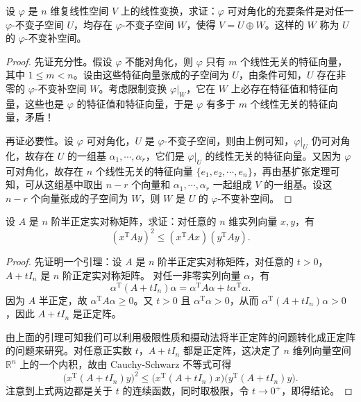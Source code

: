\documentclass[lang=cn,12pt]{elegantbook}
\begin{document}
\begin{example}
设 \(\varphi\) 是 \(n\) 维复线性空间 \(V\) 上的线性变换，求证：\(\varphi\) 可对角化的充要条件是对任一 \(\varphi\)-不变子空间 \(U\)，均存在 \(\varphi\)-不变子空间 \(W\)，使得 \(V = U \oplus W\)。这样的 \(W\) 称为 \(U\) 的 \(\varphi\)-不变补空间。
\end{example}

\begin{proof}
先证充分性。假设 \(\varphi\) 不能对角化，则 \(\varphi\) 只有 \(m\) 个线性无关的特征向量，其中 \(1 \leq m < n\)。设由这些特征向量张成的子空间为 \(U\)，由条件可知，\(U\) 存在非零的 \(\varphi\)-不变补空间 \(W\)。考虑限制变换 \(\varphi|_{W}\)，它在 \(W\) 上必存在特征值和特征向量，这些也是 \(\varphi\) 的特征值和特征向量，于是 \(\varphi\) 有多于 \(m\) 个线性无关的特征向量，矛盾！

再证必要性。设 \(\varphi\) 可对角化，\(U\) 是 \(\varphi\)-不变子空间，则由上例可知，\(\varphi|_{U}\) 仍可对角化，故存在 \(U\) 的一组基 \(\alpha_1, \cdots, \alpha_r\)，它们是 \(\varphi|_{U}\) 的线性无关的特征向量。又因为 \(\varphi\) 可对角化，故存在 \(n\) 个线性无关的特征向量 \(\{e_1, e_2, \cdots, e_n\}\)，再由基扩张定理可知，可从这组基中取出 \(n-r\) 个向量和 \(\alpha_1, \cdots, \alpha_r\) 一起组成 \(V\) 的一组基。设这 \(n-r\) 个向量张成的子空间为 \(W\)，则 \(W\) 是 \(U\) 的 \(\varphi\)-不变补空间。
\end{proof}

\begin{example}
设 \( A \) 是 \( n \) 阶半正定实对称矩阵，求证：对任意的 \( n \) 维实列向量 \( x, y \)，有
\[
(x^\mathrm{T}Ay)^2 \leq (x^\mathrm{T}Ax)(y^\mathrm{T}Ay).
\]
\end{example}

\begin{proof}
    先证明一个引理：设 \( A \) 是 \( n \) 阶半正定实对称矩阵，对任意的 \( t > 0 \)， \( A + tI_n \) 是 \( n \) 阶正定实对称矩阵。
    对任一非零实列向量 \( \alpha \)，有
\[
\alpha^\mathrm{T}(A + tI_n)\alpha = \alpha^\mathrm{T} A\alpha + t\alpha^\mathrm{T}\alpha.
\]
因为 \( A \) 半正定，故 \( \alpha^\mathrm{T}A\alpha \geq 0 \)。又 \( t > 0 \) 且 \( \alpha^\mathrm{T}\alpha > 0 \)，从而 \( \alpha^\mathrm{T}(A + tI_n)\alpha > 0 \)，因此 \( A + tI_n \) 是正定阵。

由上面的引理可知我们可以利用极限性质和摄动法将半正定阵的问题转化成正定阵的问题来研究。对任意正实数 \( t \)，\( A + tI_n \) 都是正定阵，这决定了 \( n \) 维列向量空间 \( \mathbb{R}^n \) 上的一个内积，故由 Cauchy-Schwarz 不等式可得
\[
\bigl(x^\mathrm{T}(A + tI_n)y\bigr)^2 \leq \bigl(x^\mathrm{T}(A + tI_n)x\bigr)\bigl(y^\mathrm{T}(A + tI_n)y\bigr).
\]
注意到上式两边都是关于 \( t \) 的连续函数，同时取极限，令 \( t \to 0^+ \)，即得结论。
\end{proof}
\end{document}
